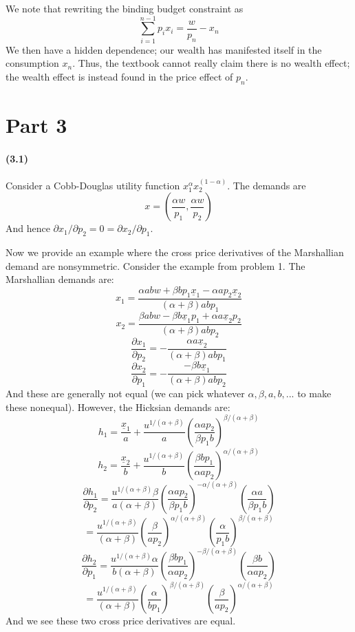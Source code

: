\documentclass[10pt,letter]{article}
\begin{document}
We note that rewriting the binding budget constraint as
\[ \sum_{i=1}^{n-1} p_ix_i = \frac{w}{p_n} - x_n \]
We then have a hidden dependence; our wealth has manifested itself in the consumption $x_n$. Thus, the textbook cannot really claim there is no wealth effect; the wealth effect is instead found in the price effect of $p_n$.

\pagebreak
\section*{Part 3}
\paragraph{(3.1)}
Consider a Cobb-Douglas utility function $x_1^\alpha x_2^{(1-\alpha)}$. The demands are
\[ x = \left( \frac{\alpha w}{p_1}, \frac{\alpha w}{p_2} \right) \]
And hence $\partial x_1 / \partial p_2 = 0 = \partial x_2 / \partial p_1$.

Now we provide an example where the cross price derivatives of the Marshallian demand are nonsymmetric. Consider the example from problem 1. The Marshallian demands are:
\[ x_1  = \frac{\alpha ab w + \beta b p_1 \underline{x}_1 - \alpha a p_2 \underline{x}_2}{(\alpha + \beta)abp_1} \]
\[ x_2 = \frac{\beta a b w - \beta b \underline{x}_1 p_1 + \alpha a \underline{x}_2p_2}{(\alpha + \beta)ab p_2} \]
\[ \frac{\partial x_1}{\partial p_2} = - \frac{\alpha a\underline{x}_2}{(\alpha + \beta)abp_1} \]
\[ \frac{\partial x_2}{\partial p_1} = - \frac{- \beta b \underline{x}_1}{(\alpha + \beta)abp_2} \]
And these are generally not equal (we can pick whatever $\alpha, \beta, a, b, ...$ to make these nonequal).
However, the Hicksian demands are:
\[ h_1 = \frac{\underline{x}_1}{a} + \frac{u^{1/(\alpha+\beta)}}{a}\left( \frac{ \alpha a p_2}{\beta p_1 b} \right)^{\beta/(\alpha + \beta)}  \]
\[ h_2 = \frac{\underline{x}_2}{b} + \frac{u^{1/(\alpha+\beta)}}{b}\left( \frac{ \beta b p_1}{\alpha a p_2} \right)^{\alpha/(\alpha + \beta)}  \]
\[ \frac{\partial h_1}{\partial p_2} = \frac{u^{1/(\alpha+\beta)}\beta}{a(\alpha + \beta)}\left( \frac{ \alpha a p_2}{\beta p_1 b} \right)^{-\alpha/(\alpha + \beta)} \left(\frac{\alpha a}{\beta p_1 b} \right) \]
\[ = \frac{u^{1/(\alpha+\beta)}}{(\alpha + \beta)}\left( \frac{\beta }{ a p_2} \right)^{\alpha/(\alpha + \beta)} \left(\frac{\alpha }{ p_1 b} \right)^{\beta/(\alpha+\beta)} \]
\[ \frac{\partial h_2}{\partial p_1} = \frac{u^{1/(\alpha+\beta)}\alpha}{b(\alpha + \beta)}\left( \frac{ \beta b p_1}{\alpha a p_2} \right)^{-\beta/(\alpha + \beta)} \left(\frac{\beta b}{\alpha a p_2} \right) \]
\[= \frac{u^{1/(\alpha+\beta)}}{(\alpha + \beta)}\left( \frac{\alpha } { b p_1}\right)^{\beta/(\alpha + \beta)} \left(\frac{\beta }{ ap_2} \right)^{\alpha/(\alpha + \beta)}\]
And we see these two cross price derivatives are equal.
\end{document}
